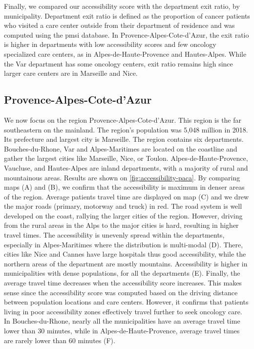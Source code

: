 Finally, we compared our accessibility score with the department exit ratio, by municipality. Department exit ratio is defined as the proportion of cancer patients who visited a care center outside from their department of residence and was computed using the \ac{pmsi} database. In Provence-Alpes-Cote-d'Azur, the exit ratio is higher in departments with low accessibility scores and few oncology specialized care centers, as in Alpes-de-Haute-Provence and Hautes-Alpes. While the Var department has some oncology centers, exit ratio remains high since larger care centers are in Marseille and Nice.

\subsection*{Provence-Alpes-Cote-d'Azur}

We now focus on the region Provence-Alpes-Cote-d'Azur. This region is the far southeastern on the mainland. The region's population was 5,048 million in 2018. Its prefecture and largest city is Marseille. The region contains six departments. Bouches-du-Rhone, Var and Alpes-Maritimes are located on the coastline and gather the largest cities like Marseille, Nice, or Toulon. Alpes-de-Haute-Provence, Vaucluse, and Hautes-Alpes are inland departments, with a majority of rural and mountainous areas. Results are shown on \cref{fig:accessibility-paca}. By comparing maps (A) and (B), we confirm that the accessibility is maximum in denser areas of the region. Average patients travel time are displayed on map (C) and we drew the major roads (primary, motorway and truck) in red. The road system is well developed on the coast, rallying the larger cities of the region. However, driving from the rural areas in the Alps to the major cities is hard, resulting in higher travel times. The accessibility is unevenly spread within the departments, especially in Alpes-Maritimes where the distribution is multi-modal (D). There, cities like Nice and Cannes have large hospitals thus good accessibility, while the northern areas of the department are mostly mountains. Accessibility is higher in municipalities with dense populations, for all the departments (E). Finally, the average travel time decreases when the accessibility score increases. This makes sense since the accessibility score was computed based on the driving distance between population locations and care centers. However, it confirms that patients living in poor accessibility zones effectively travel further to seek oncology care. In Bouches-du-Rhone, nearly all the municipalities have an average travel time lower than 30 minutes, while in Alpes-de-Haute-Provence, average travel times are rarely lower than 60 minutes (F).

